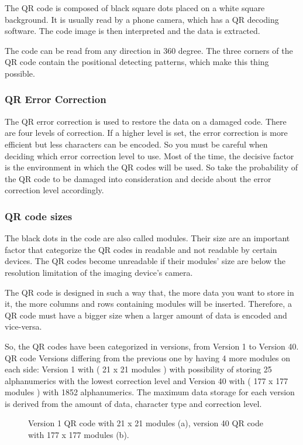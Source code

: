 The QR code is  composed of black square dots placed on a white square background. It is usually read by a phone camera, which has a QR decoding software. The code image is then interpreted and the data is extracted.

The code can be read from any direction in 360 degree. The three corners of the QR code contain the positional detecting patterns, which make this thing possible.

\subsubsection{QR Error Correction}
The QR error correction is used to restore the data on a damaged code. There are four levels of correction. If a higher level is set, the error correction is more efficient but less characters can be encoded. So you must be careful when deciding which error correction level to use. Most of the time, the decisive factor is the environment in which the QR codes will be used. So take the probability of the QR code to be damaged into consideration and decide about the error correction level accordingly.

\subsubsection{QR code sizes}
The black dots in the code are also called modules. Their size are an important factor that categorize the QR codes in readable and not readable by certain devices. The QR codes become unreadable if their modules’ size are below the resolution limitation of the imaging device’s camera.

The QR code is designed in such a way that, the more data you want to store in it, the more columns and rows containing modules will be inserted. Therefore, a QR code must have a bigger size when a larger amount of data is encoded and vice-versa.

So, the QR codes have been categorized in versions, from Version 1 to Version 40.  QR code Versions differing from the previous one by having 4 more modules on each side: Version 1 with ( 21 x 21 modules ) with possibility of storing 25 alphanumerics with the lowest correction level and Version 40 with  ( 177 x 177 modules ) with 1852 alphanumerics. The maximum data storage for each version is derived from the amount of data, character type and correction level.


\begin{figure}[!ht]
  \centering
 \hspace{0.09cm}
  \caption{Version 1 QR code with 21 x 21 modules (a), version 40 QR code with 177 x 177 modules (b).}
  \label{fig1.1}
\end{figure}



